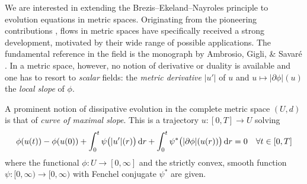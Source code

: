 \documentclass[reqno]{amsart}
\newcommand{\dr}{{\rm d} r}
\renewcommand{\sl}{|\partial \phi|}
\begin{document}
We are interested in extending the Brezis--Ekeland--Nayroles
principle to evolution equations in metric spaces. Originating from the pioneering
 contributions \cite{JKO,Otto01},  flows in metric spaces have
 specifically received
 a strong development, motivated by their wide range of possible
 applications. The fundamental reference in the field is the monograph
 by {\sc Ambrosio, Gigli, \& Savar\'e} \cite{Ambrosio08}. In a metric space, however, no
notion of derivative  or duality  is available
and one has to
resort to {\it scalar} fields: the {\it metric
  derivative} $|u'|$ of $u$ and $u \mapsto \sl(u)$ the {\it local slope} of $\phi$.

 A  prominent  notion of dissipative evolution in the complete metric
 space $(U,d)$ is that of {\it curve of maximal slope}. This is
  a  trajectory $u:[0,T]\to U$ solving 
\begin{equation}
  \label{eq:intro_EDE}
  \phi(u(t)) - \phi(u(0)) + \int_0^t\psi\big(|u'|(r)\big) \, \dr +
  \int_0^t\psi^*\big(\sl(u(r))\big)\, \dr=0 \quad \forall t
  \in [0,T]
\end{equation}
where the functional $\phi:U \to [0,\infty]$ and the strictly convex,
smooth  function \linebreak $\psi:[0,\infty) \to [0,\infty)$ with Fenchel conjugate $\psi^*$ are
given.
 
\end{document}
